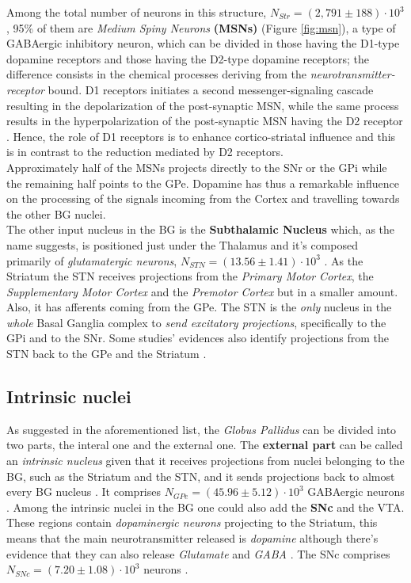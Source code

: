 \documentclass[MSc,english]{Container/thesistemplate}
\begin{document}
Among the total number of neurons in this structure, $N_{Str}=(2,791\pm 188)\cdot 10^3$ \cite{oorschot}, 95\% of them are \emph{Medium Spiny Neurons} \textbf{(MSNs)} (Figure \ref{fig:msn}), a type of GABAergic inhibitory neuron, which can be divided in those having the D1-type dopamine receptors and those having the D2-type dopamine receptors; the difference consists in the chemical processes deriving from the \emph{neurotransmitter-receptor} bound. D1 receptors initiates a second messenger-signaling cascade resulting in the depolarization of the post-synaptic MSN, while the same process results in the hyperpolarization of the post-synaptic MSN having the D2 receptor \cite{utterbasso}. Hence, the role of D1 receptors is to enhance cortico-striatal influence and this is in contrast to the reduction mediated by D2 receptors.
\\ Approximately half of the MSNs projects directly to the SNr or the GPi while the remaining half points to the GPe. Dopamine has thus a remarkable influence on the processing of the signals incoming from the Cortex and travelling towards the other BG nuclei.
\\ The other input nucleus in the BG is the \textbf{Subthalamic Nucleus} which, as the name suggests, is positioned just under the Thalamus and it's composed primarily of \emph{glutamatergic neurons}, $N_{STN} = (13.56\pm 1.41)\cdot 10^3$ \cite{oorschot}. As the Striatum the STN receives projections from the \emph{Primary Motor Cortex}, the \emph{Supplementary Motor Cortex} and the \emph{Premotor Cortex} but in a smaller amount. Also, it has afferents coming from the GPe. The STN is the \emph{only} nucleus in the \emph{whole} Basal Ganglia complex to \emph{send excitatory projections}, specifically to the GPi and to the SNr. Some studies' evidences also identify projections from the STN back to the GPe and the Striatum \cite{nelsonkreitzer}.

\subsection*{Intrinsic nuclei}
As suggested in the aforementioned list, the \emph{Globus Pallidus} can be divided into two parts, the interal one and the external one. The \textbf{external part} can be called an \emph{intrinsic nucleus} given that it receives projections from nuclei belonging to the BG, such as the Striatum and the STN, and it sends projections back to almost every BG nucleus \cite{nelsonkreitzer}. It comprises $N_{GPe} = (45.96 \pm 5.12)\cdot 10^3$ GABAergic neurons \cite{oorschot}. Among the intrinsic nuclei in the BG one could also add the \textbf{SNc} and the VTA. These regions contain \emph{dopaminergic neurons} projecting to the Striatum, this means that the main neurotransmitter released is \emph{dopamine} although there's evidence that they can also release \emph{Glutamate} and \emph{GABA} \cite{nelsonkreitzer}. The SNc comprises $N_{SNc} = (7.20 \pm 1.08) \cdot 10^3$ neurons \cite{oorschot}.
\end{document}
